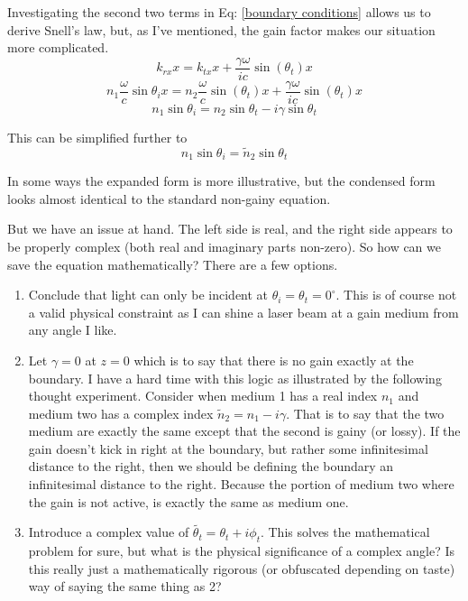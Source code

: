 \documentclass[10pt,a4paper]{article}
\begin{document}
Investigating the second two terms in Eq: \ref{boundary conditions} allows us to derive Snell's law, but, as I've mentioned, the gain factor makes our situation more complicated.
\begin{equation}
k_{rx}x=k_{tx}x +\frac{\gamma\omega}{ic}\sin(\theta_t)x
\end{equation}
\begin{equation}
n_1\frac{\omega}{c}\sin\theta_i x=n_2\frac{\omega}{c}\sin(\theta_t) x +\frac{\gamma\omega}{ic}\sin(\theta_t)x
\end{equation}
\begin{equation}\label{Snell's law expanded}
n_1\sin\theta_i=n_2\sin\theta_t -i\gamma\sin\theta_t
\end{equation}

This can be simplified further to
\begin{equation}\label{Snel's law standard}
n_1\sin\theta_i=\tilde{n}_2\sin\theta_t
\end{equation}

In some ways the expanded form is more illustrative, but the condensed form looks almost identical to the standard non-gainy equation. 

But we have an issue at hand.  The left side is real, and the right side appears to be properly complex (both real and imaginary parts non-zero). So how can we save the equation mathematically? There are a few options.
\begin{enumerate}
\item Conclude that light can only be incident at $\theta_i=\theta_t=0^\circ$.  This is of course not a valid physical constraint as I can shine a laser beam at a gain medium from any angle I like.
\item Let $\gamma=0$ at $z=0$ which is to say that there is no gain exactly at the boundary. I have a hard time with this logic as illustrated by the following thought experiment. Consider when medium 1 has a real index $n_1$ and medium two has a complex index $\tilde{n}_2=n_1-i\gamma$. That is to say that the two medium are exactly the same except that the second is gainy (or lossy). If the gain doesn't kick in right at the boundary, but rather some infinitesimal distance to the right, then we should be defining the boundary an infinitesimal distance to the right. Because the portion of medium two where the gain is not active, is exactly the same as medium one.
\item Introduce a complex value of $\tilde{\theta_t}=\theta_t +i \phi_t$. This solves the mathematical problem for sure, but what is the physical significance of a complex angle?  Is this really just a mathematically rigorous (or obfuscated depending on taste) way of saying the same thing as 2?
\end{enumerate}
\end{document}

